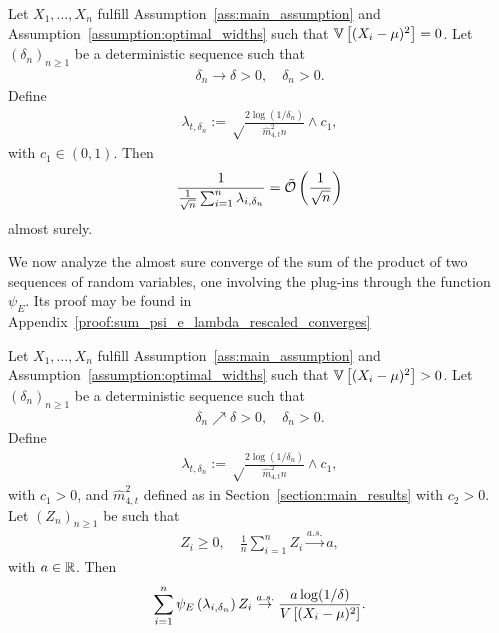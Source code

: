 \begin{proposition} \label{proposition:sum_lambda_rescaled_converges_zero_fourth_moment}
    Let $X_1, \ldots, X_n$ fulfill Assumption~\ref{ass:main_assumption} and Assumption~\ref{assumption:optimal_widths} such that $\mathbb{V} \left[ (X_i-\mu)^2\right] = 0$. Let $(\delta_n)_{n \geq 1}$ be a deterministic sequence such that
    \begin{align*}
        \delta_n \to \delta > 0, \quad \delta_n >0.
    \end{align*}
    Define
    \begin{align*}
        \lambda_{t,\delta_n} := \sqrt\frac{2\log(1/\delta_n)}{\widehat m_{4, t}^2 n} \wedge c_1,
    \end{align*}
    with $c_1 \in (0, 1)$. Then
    \begin{align*}
        \frac{1}{\frac{1}{\sqrt{n}} \sum_{i = 1}^n \lambda_{i,\delta_n}} = \tilde {\mathcal{O}} \left( \frac{1}{\sqrt n} \right)
    \end{align*}
    almost surely.
\end{proposition}

We now analyze the almost sure converge of the sum of the product of two sequences of random variables, one involving the plug-ins through the function $\psi_E$. Its proof may be found in Appendix~\ref{proof:sum_psi_e_lambda_rescaled_converges}

\begin{proposition} \label{proposition:sum_psi_e_lambda_rescaled_converges}
    Let $X_1, \ldots, X_n$ fulfill Assumption~\ref{ass:main_assumption} and Assumption~\ref{assumption:optimal_widths} such that $\mathbb{V} \left[ (X_i-\mu)^2\right] > 0$. Let $(\delta_n)_{n \geq 1}$ be a deterministic sequence such that
    \begin{align*}
        \delta_n \nearrow \delta > 0, \quad \delta_n >0.
    \end{align*}
    Define
    \begin{align*}
        \lambda_{t,\delta_n} := \sqrt\frac{2\log(1/\delta_n)}{\widehat m_{4, t}^2 n} \wedge c_1,
    \end{align*}
    with $c_1 > 0$, and $\widehat m_{4, t}^2$ defined as in Section~\ref{section:main_results} with $c_2 > 0$. Let $(Z_n)_{n\geq1}$ be such that
    \begin{align*} 
        Z_i \geq 0, \quad \frac{1}{n} \sum_{i=1}^n Z_i \stackrel{a.s.}{\to} a,
    \end{align*}
    with $a \in \mathbb{R}$. Then
    \begin{align*}
         \sum_{i = 1}^n \psi_E \left( \lambda_{i,\delta_n} \right) Z_i \stackrel{a.s.}{\to} \frac{a \log(1/\delta)}{V \left[ (X_i-\mu)^2\right]}.
    \end{align*}
\end{proposition}






